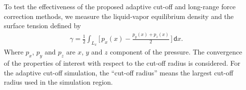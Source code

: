 \documentclass[aps,pre,preprint]{revtex4-1}
\renewcommand{\d}[1]{\textsf{#1}}
\begin{document}


To test the effectiveness of the proposed adaptive cut-off and
long-range force correction methods, we measure the liquid-vapor
equilibrium density and the surface tension defined by
\begin{align}
  \gamma = \frac12 \int_{L_x}
  \bigg[\,
  p_x(x) - \frac{p_y(x) + p_z(x)}{2}
  \,\bigg]
  \,\d dx.
\end{align}
Where $p_x$, $p_y$ and $p_z$ are $x$, $y$ and $z$ component of the
pressure. The convergence of the properties of interest with respect
to the cut-off radius is considered.  For the adaptive cut-off
simulation, the ``cut-off radius'' means the largest cut-off radius
used in the simulation region. 
\end{document}
